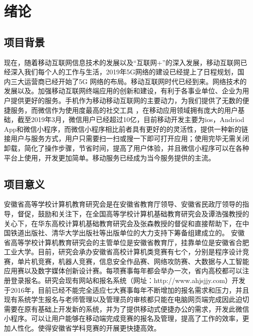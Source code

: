 \documentclass[a4paper]{ltxdoc}
\begin{document}
	\fancyhead{}
	\pagestyle{fancy}
	
	{
		\setcounter{page}{1}
		\pretocmd{\section}{\clearpage \vspace*{-2.0em}}{}{}
		
		\setlength{\parindent}{2em}
		\setlength{\parskip}{0.5em}
		\setlength{\baselineskip}{22pt}
		
		\section{绪论}
		\subsection{项目背景}
		现在，随着移动互联网信息技术的发展以及“互联网+”的深入发展，移动互联网已经深入我们每个人的工作与生活，2019年5G网络的建设已经提上了日程规划，国内三大运营商已经开始了5G 网络的布局。移动互联网时代已经到来。网络技术的发展以及。加强移动互联网终端应用的创新和建设，有利于各事业单位、企业为用户提供更好的服务。手机作为移动移动互联网的主要动力，为我们提供了无数的便捷服务，而微信作为使用度最高的社交工具 ，在移动应用领域拥有庞大的用户基础，截至2019年3月，微信用户已经超过10亿，目前移动开发主要为ios，Andriod App和微信小程序，而微信小程序相比前者具有更好的的灵活性，提供一种新的链接用户与服务方式，用户只需要扫一扫或搜一下即可打开应用；使用完毕无需关闭卸载，简化了操作步骤，节省时间，提高了用户体验，并且微信小程序可以在各种平台上使用，开发更加简单。移动服务已经成为当今服务提供的主流。
		
		\subsection{项目意义}
		安徽省高等学校计算机教育研究会是在安徽省教育厅领导、安徽省民政厅领导的指导，督促，鼓励和关注下，在全国高等学校计算机基础教育研究会及谭浩强教授的关心下，在华东高校计算机基础教育研究会及张森教授的督促和直接帮助下，在中国铁道出版社、清华大学出版社等出版单位的大力支持下筹备组建成立的。 安徽省高等学校计算机教育研究会的主管单位是安徽省教育厅，挂靠单位是安徽省合肥工业大学。目前，研究会承办安徽省高校计算机类竞赛有七个，分别是程序设计竞赛，单片机竞赛，机器人竞赛，信息安全作品赛、网络攻防赛、大数据与人工智能应用赛以及数字媒体创新设计赛。每项赛事每年都会举办一次，省内高校都可以注册登录报名。研究会现有网站和报名系统（网址：http://www.ahjsjjy.com）开发于2016年，目前已经不能完全适应七大赛事每年不断增加的报名需求和压力，并且现有系统学生报名与老师管理以及管理员的审核都只能在电脑网页端完成因此迫切需要在原有基础上开发新的系统，并为了提供移动式便捷办公的需求，开发此微信小程序。可以让用户能够在移动端完成竞赛的报名及管理，提高了工作的效率，更加人性化。使得安徽省学科竞赛的开展更快捷高效。
		
}
\end{document}
